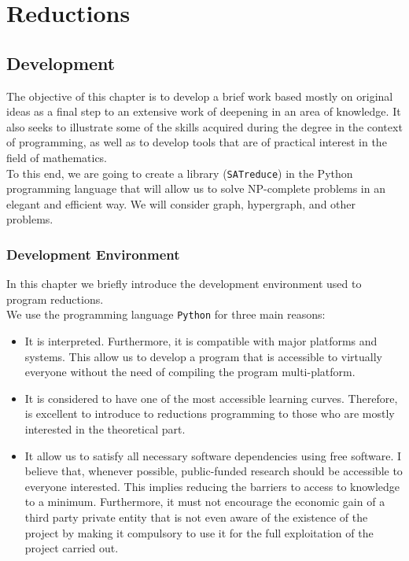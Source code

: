 \part{Reductions} %

\label{chap:3}


\chapter{Development}

The objective of this chapter is to develop a brief work based mostly on original ideas as a final step to an extensive work of deepening in an area of knowledge. It also seeks to illustrate some of the skills acquired during the degree in the context of programming, as well as to develop tools that are of practical interest in the field of mathematics. \\

To this end, we are going to create a library (\texttt{SATreduce}) in the Python  programming language that will allow us to solve NP-complete problems in an elegant and efficient way.  We will consider graph, hypergraph, and other problems. 

\section{Development Environment}

In this chapter we briefly introduce the development environment used to program reductions.\\

We use the programming language \texttt{Python} for three main reasons:

\begin{itemize}
\item It is interpreted. Furthermore, it is compatible with major platforms and systems. This allow us to develop a program that is accessible to virtually everyone without the need of compiling the program multi-platform. 

\item It is considered to have one of the most accessible learning curves. Therefore, is excellent to introduce to reductions programming to those who are mostly interested in the theoretical part.

\item It allow us to satisfy all necessary software dependencies using  free software\cite{stallman2002free}. I believe that, whenever possible, public-funded research should be accessible to everyone interested. This implies reducing the barriers to access to knowledge to a minimum.  Furthermore, it must not encourage the economic gain of a third party private entity that is not even aware of the existence of the project by making it compulsory to use it for the full exploitation of the project carried out.
\end{itemize}



